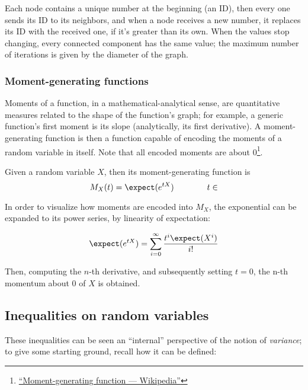 \begin{example}
    Each node contains a unique number at the beginning (an ID), then every one sends its ID to its neighbors, and when a node receives a new number, it replaces its ID with the received one, if it's greater than its own. When the values stop changing, every connected component has the same value; the maximum number of iterations is given by the diameter of the graph.
\end{example}


\subsubsection{Moment-generating functions}
	
Moments of a function, in a mathematical-analytical sense, are quantitative measures related to the shape of the function's graph; for example, a generic function's first moment is its slope (analytically, its first derivative). A moment-generating function is then a function capable of encoding the moments of a random variable in itself. Note that all encoded moments are about 0\footnote{\linkicon \href{https://en.wikipedia.org/wiki/Moment-generating_function}{\textsf{``Moment-generating function --- Wikipedia''}}}.

\begin{definition} Given a random variable $X$, then its moment-generating function is
    \begin{equation}
        M_X(t) = \expect(e^{tX}) \qquad \qquad t \in \real
    \end{equation}
\end{definition}

In order to visualize how moments are encoded into $M_X$, the exponential can be expanded to its power series, by linearity of expectation:

\[
    \expect(e^{tX}) = \sum_{i = 0}^{\infty} \frac{t^i \expect(X^i)}{i!}
\]

Then, computing the $n$-th derivative, and subsequently setting $t = 0$, the n-th momentum about $0$ of $X$ is obtained.

\subsection{Inequalities on random variables}

These inequalities can be seen an ``internal'' perspective of the notion of \emph{variance}; to give some starting ground, recall how it can be defined:

